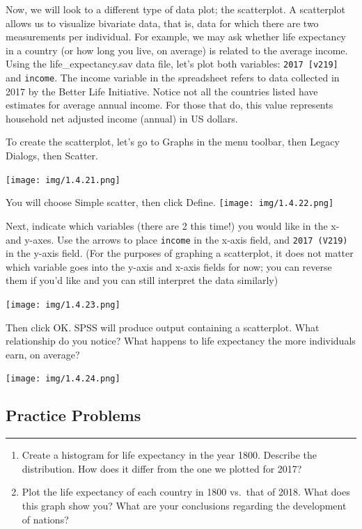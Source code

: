 \documentclass[]{book}
\begin{document}
Now, we will look to a different type of data plot; the scatterplot. A
scatterplot allows us to visualize bivariate data, that is, data for
which there are two measurements per individual. For example, we may ask
whether life expectancy in a country (or how long you live, on average)
is related to the average income. Using the life\_expectancy.sav data
file, let's plot both variables: \texttt{2017\ {[}v219{]}} and
\texttt{income}. The income variable in the spreadsheet refers to data
collected in 2017 by the Better Life Initiative. Notice not all the
countries listed have estimates for average annual income. For those
that do, this value represents household net adjusted income (annual) in
US dollars.

To create the scatterplot, let's go to {Graphs} in the menu toolbar,
then {Legacy Dialogs}, then {Scatter}.

\texttt{[image: img/1.4.21.png]}

You will choose {Simple} scatter, then click {Define}.
\texttt{[image: img/1.4.22.png]}

Next, indicate which variables (there are 2 this time!) you would like
in the x- and y-axes. Use the arrows to place \texttt{income} in the
x-axis field, and \texttt{2017\ (V219)} in the y-axis field. (For the
purposes of graphing a scatterplot, it does not matter which variable
goes into the y-axis and x-axis fields for now; you can reverse them if
you'd like and you can still interpret the data similarly)

\texttt{[image: img/1.4.23.png]}

Then click {OK}. SPSS will produce output containing a scatterplot. What
relationship do you notice? What happens to life expectancy the more
individuals earn, on average?

\texttt{[image: img/1.4.24.png]}

\subsection{Practice Problems}\label{practice-problems-1}

\begin{center}\rule{0.5\linewidth}{0.5pt}\end{center}

\begin{enumerate}
\def\labelenumi{\arabic{enumi}.}
\item
  Create a histogram for life expectancy in the year 1800. Describe the
  distribution. How does it differ from the one we plotted for 2017?
\item
  Plot the life expectancy of each country in 1800 vs.~that of 2018.
  What does this graph show you? What are your conclusions regarding the
  development of nations?
\end{enumerate}
\end{document}
